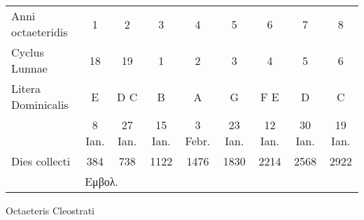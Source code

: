 %
\small
\centering
\setlength{\tabcolsep}{3pt}
\renewcommand{\arraystretch}{1.1}
\begin{tabular}{@{}l cccccccc@{}}
\toprule
Anni octaeteridis &
1\super{†} & 2 & 3\super{†} & 4 & 5 & 6\super{†} & 7 & 8 \\
Cyclus Lunnae &
18 & 19 & 1 & 2 & 3 & 4 & 5 & 6 \\
Litera Dominicalis &
E & D C & B & A & G & F E & D & C \\
~ &
8 Ian. & 27 Ian. & 15 Ian. & 3 Febr. & 23 Ian. & 12 Ian. & 30 Ian. & 19 Ian. \\
Dies collecti &
384 &  738 & 1122 & 1476 & 1830 & 2214 & 2568 & 2922 \\
\bottomrule
\addlinespace
~ & \multicolumn{5}{l}{\footnotesize \super{†} \textgreek{Εμβολ.}}\\
\end{tabular}
%
\caption{Octaeteris Cleostrati}
\label{tab:p065}
%